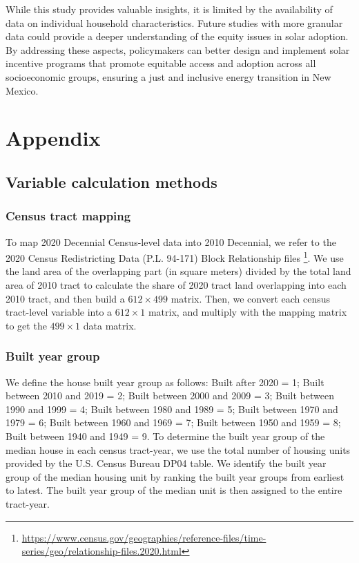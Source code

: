 \documentclass[12pt,twoside,letterpaper]{article}
\begin{document}
While this study provides valuable insights, it is limited by the availability of data on individual household characteristics. Future studies with more granular data could provide a deeper understanding of the equity issues in solar adoption. By addressing these aspects, policymakers can better design and implement solar incentive programs that promote equitable access and adoption across all socioeconomic groups, ensuring a just and inclusive energy transition in New Mexico.



\newpage
\appendix
{}
\section[Appendix]{Appendix}

\subsection{Variable calculation methods}
\label{subsec:Variable_Cal}
\subsubsection*{Census tract mapping}
To map 2020 Decennial Census-level data into 2010 Decennial, we refer to the 2020 Census Redistricting Data (P.L. 94-171) Block Relationship files \footnote{\url{https://www.census.gov/geographies/reference-files/time-series/geo/relationship-files.2020.html}}. We use the land area of the overlapping part (in square meters) divided by the total land area of 2010 tract to calculate the share of 2020 tract land overlapping into each 2010 tract, and then build a $612 \times 499$ matrix. Then, we convert each census tract-level variable into a $612 \times 1$ matrix, and multiply with the mapping matrix to get the $499 \times 1$ data matrix.

\subsubsection*{Built year group}
We define the house built year group as follows: Built after 2020 = 1; Built between 2010 and 2019 = 2; Built between 2000 and 2009 = 3; Built between 1990 and 1999 = 4; Built between 1980 and 1989 = 5; Built between 1970 and 1979 = 6; Built between 1960 and 1969 = 7; Built between 1950 and 1959 = 8; Built between 1940 and 1949 = 9. To determine the built year group of the median house in each census tract-year, we use the total number of housing units provided by the U.S. Census Bureau DP04 table. We identify the built year group  of the median housing unit by ranking the built year groups from earliest to latest. The built year group of the median unit is then assigned to the entire tract-year.
\end{document}
